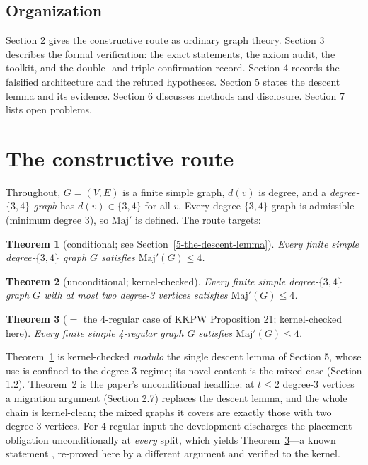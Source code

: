\documentclass[11pt]{article}
\newtheorem{theorem}{Theorem}[section]
\theoremstyle{definition}
\theoremstyle{remark}
\newcommand{\Maj}{\ensuremath{\mathrm{Maj}'}}
\begin{document}
\subsection{Organization}\label{15-organization}

Section 2 gives the constructive route as ordinary graph theory. Section 3 describes the formal verification: the exact statements, the axiom audit, the toolkit, and the double- and triple-confirmation record. Section 4 records the falsified architecture and the refuted hypotheses. Section 5 states the descent lemma and its evidence. Section 6 discusses methods and disclosure. Section 7 lists open problems.

\section{The constructive route}\label{2-the-constructive-route}

Throughout, $G = (V,E)$ is a finite simple graph, $d(v)$ is degree, and a \emph{degree-$\{3,4\}$ graph} has $d(v) \in \{3,4\}$ for all $v$. Every degree-$\{3,4\}$ graph is admissible (minimum degree $3$), so $\Maj$ is defined. The route targets:

\begin{theorem}[conditional; see Section~\ref{5-the-descent-lemma}]\label{thm:threefour}
Every finite simple degree-$\{3,4\}$ graph $G$ satisfies $\Maj(G) \le 4$.
\end{theorem}

\begin{theorem}[unconditional; kernel-checked]\label{thm:t2}
Every finite simple degree-$\{3,4\}$ graph $G$ with at most two degree-3 vertices satisfies $\Maj(G) \le 4$.
\end{theorem}

\begin{theorem}[{$=$ the 4-regular case of KKPW Proposition 21; kernel-checked here}]\label{thm:fourreg}
Every finite simple 4-regular graph $G$ satisfies $\Maj(G) \le 4$.
\end{theorem}

Theorem~\ref{thm:threefour} is kernel-checked \emph{modulo} the single descent lemma of Section 5, whose use is confined to the degree-3 regime; its novel content is the mixed case (Section 1.2). Theorem~\ref{thm:t2} is the paper's unconditional headline: at $t \le 2$ degree-3 vertices a migration argument (Section 2.7) replaces the descent lemma, and the whole chain is kernel-clean; the mixed graphs it covers are exactly those with two degree-3 vertices. For 4-regular input the development discharges the placement obligation unconditionally at \emph{every} split, which yields Theorem~\ref{thm:fourreg}---a known statement \cite{KKPW}, re-proved here by a different argument and verified to the kernel.
\end{document}
